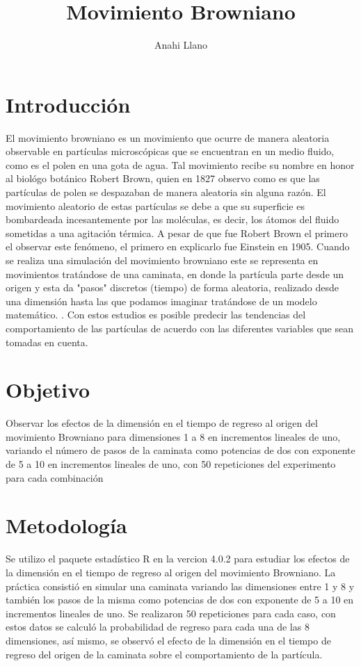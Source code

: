 \documentclass{article}
\title { Movimiento Browniano}
\author{Anahi Llano}
\begin{document}
\maketitle

\section{Introducci\'on}\label{intro}

El movimiento browniano es un movimiento que ocurre de manera aleatoria observable en part\'iculas microsc\'opicas que se encuentran en un medio fluido, como es el polen en una gota de agua. Tal movimiento recibe su nombre en honor al biol\'ogo bot\'anico Robert Brown, quien en 1827 observo como es que las part\'iculas de polen se despazaban de manera aleatoria sin alguna raz\'on. El movimiento aleatorio de estas part\'iculas se debe a que su superficie es bombardeada incesantemente por las mol\'eculas, es decir, los \'atomos del fluido sometidas a una agitaci\'on t\'ermica. \citet{baz}
A pesar de que fue Robert Brown el primero el observar este fen\'omeno, el primero en explicarlo fue Einstein en 1905.
Cuando se realiza una simulaci\'on del movimiento browniano este se representa en movimientos trat\'andose de una caminata, en donde la part\'icula parte desde un origen y esta da "pasos" discretos (tiempo) de forma aleatoria, realizado desde una dimensi\'on hasta las que podamos imaginar trat\'andose de un modelo matem\'atico. \citep{Eli}. Con estos estudios es posible predecir las tendencias del comportamiento de las part\'iculas de acuerdo con las diferentes variables que sean tomadas en cuenta.

\section{Objetivo}\label{objec}

Observar  los efectos de la dimensi\'on en el tiempo de regreso al origen del movimiento Browniano para dimensiones 1 a 8 en incrementos lineales de uno, variando el n\'umero de pasos de la caminata como potencias de dos con exponente de 5 a 10 en incrementos lineales de uno, con 50 repeticiones del experimento para cada combinaci\'on

\newpage
\section{Metodolog\'ia}\label{met}

Se utilizo el paquete estad\'istico R en la vercion 4.0.2 para estudiar los efectos de la dimensi\'on en el tiempo de regreso al origen del movimiento Browniano.
La pr\'actica consisti\'o en simular una caminata variando las dimensiones entre 1 y 8 y tambi\'en los pasos de la misma como potencias de dos con exponente de 5 a 10 en incrementos lineales de uno.  Se realizaron 50 repeticiones para cada caso, con estos datos se
calcul\'o la probabilidad de regreso para cada una de las 8 dimensiones, as\'i mismo, se observ\'o el efecto de la dimensi\'on en el tiempo de regreso del origen de la caminata sobre el comportamiento de la part\'icula.
\end{document}
